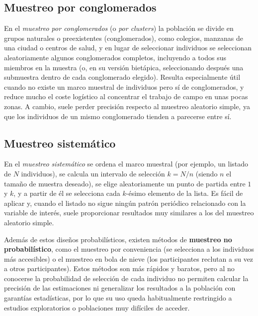 \documentclass[
  spanish,
  a4paper,
]{scrreport}
\theoremstyle{definition}
\theoremstyle{definition}
\theoremstyle{remark}
\begin{document}
\subsection{Muestreo por
conglomerados}\label{muestreo-por-conglomerados}

En el \emph{muestreo por conglomerados} (o \emph{por clusters}) la
población se divide en grupos naturales o preexistentes (conglomerados),
como colegios, manzanas de una ciudad o centros de salud, y en lugar de
seleccionar individuos se seleccionan aleatoriamente algunos
conglomerados completos, incluyendo a todos sus miembros en la muestra
(o, en su versión bietápica, seleccionando después una submuestra dentro
de cada conglomerado elegido). Resulta especialmente útil cuando no
existe un marco muestral de individuos pero sí de conglomerados, y
reduce mucho el coste logístico al concentrar el trabajo de campo en
unas pocas zonas. A cambio, suele perder precisión respecto al muestreo
aleatorio simple, ya que los individuos de un mismo conglomerado tienden
a parecerse entre sí.

\subsection{Muestreo sistemático}\label{muestreo-sistemuxe1tico}

En el \emph{muestreo sistemático} se ordena el marco muestral (por
ejemplo, un listado de \(N\) individuos), se calcula un intervalo de
selección \(k = N/n\) (siendo \(n\) el tamaño de muestra deseado), se
elige aleatoriamente un punto de partida entre \(1\) y \(k\), y a partir
de él se selecciona cada \(k\)-ésimo elemento de la lista. Es fácil de
aplicar y, cuando el listado no sigue ningún patrón periódico
relacionado con la variable de interés, suele proporcionar resultados
muy similares a los del muestreo aleatorio simple.

Además de estos diseños probabilísticos, existen métodos de
\textbf{muestreo no probabilístico}, como el muestreo por conveniencia
(se selecciona a los individuos más accesibles) o el muestreo en bola de
nieve (los participantes reclutan a su vez a otros participantes). Estos
métodos son más rápidos y baratos, pero al no conocerse la probabilidad
de selección de cada individuo no permiten calcular la precisión de las
estimaciones ni generalizar los resultados a la población con garantías
estadísticas, por lo que su uso queda habitualmente restringido a
estudios exploratorios o poblaciones muy difíciles de acceder.
\end{document}
